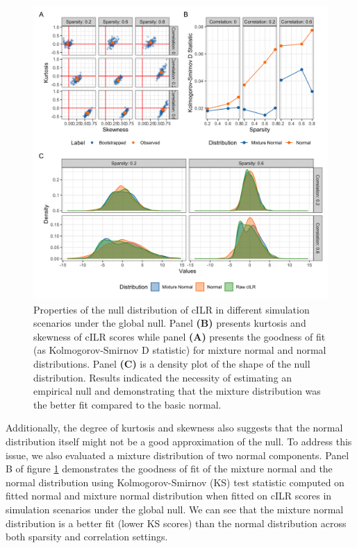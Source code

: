 \documentclass{article}
\begin{document}
\begin{figure} [H]
    \centering
    \includegraphics[width=\linewidth]{figures/kurtosis_skewness_gof.png}
    \caption{Properties of the null distribution of cILR in different simulation scenarios under the global null. Panel \textbf{(B)} presents kurtosis and skewness of cILR scores while panel \textbf{(A)} presents the goodness of fit (as Kolmogorov-Smirnov D statistic) for mixture normal and normal distributions. Panel \textbf{(C)} is a density plot of the shape of the null distribution. Results indicated the necessity of estimating an empirical null and demonstrating that the mixture distribution was the better fit compared to the basic normal.}
    \label{fig:kurt_gof}
\end{figure}

Additionally, the degree of kurtosis and skewness also suggests that the normal distribution itself might not be a good approximation of the null. To address this issue, we also evaluated a mixture distribution of two normal components. Panel B of figure \ref{fig:kurt_gof} demonstrates the goodness of fit of the mixture normal and the normal distribution using Kolmogorov-Smirnov (KS) test statistic computed on fitted normal and mixture normal distribution when fitted on cILR scores in simulation scenarios under the global null. We can see that the mixture normal distribution is a better fit (lower KS scores) than the normal distribution across both sparsity and correlation settings. 
\end{document}
